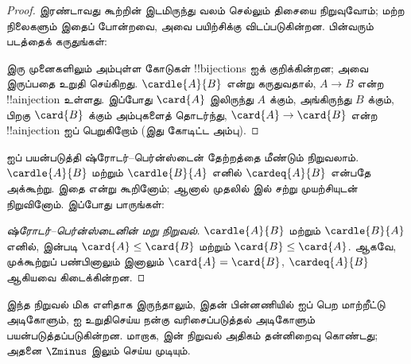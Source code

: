 \documentclass[../../../include/open-logic-section]{subfiles}
\begin{document}
\begin{proof}
இரண்டாவது கூற்றின் இடமிருந்து வலம் செல்லும் திசையை நிறுவுவோம்;
மற்ற நிலைகளும் இதைப் போன்றவை, அவை பயிற்சிக்கு விடப்படுகின்றன.
பின்வரும் படத்தைக் கருதுங்கள்:
\begin{center}
\end{center}
இரு முனைகளிலும் அம்புள்ள கோடுகள் !!{bijection}s ஐக் குறிக்கின்றன;
 அவை இருப்பதை உறுதி செய்கிறது.
$\cardle{A}{B}$ என்று கருதுவதால், $A\to B$ என்ற
!!a{injection} உள்ளது. இப்போது $\card{A}$ இலிருந்து $A$ க்கும்,
அங்கிருந்து $B$ க்கும், பிறகு $\card{B}$ க்கும் அம்புகளைத் தொடர்ந்து,
$\card{A} \to \card{B}$ என்ற !!a{injection} ஐப் பெறுகிறோம்
(இது கோடிட்ட அம்பு).
\end{proof}\noindent
{} ஐப் பயன்படுத்தி
ஷ்ரோடர்--பெர்ன்ஸ்டைன் தேற்றத்தை மீண்டும் நிறுவலாம்.
$\cardle{A}{B}$ மற்றும் $\cardle{B}{A}$ எனில் $\cardeq{A}{B}$
என்பதே அக்கூற்று. இதை 
என்று கூறினோம்; ஆனால் முதலில்  இல்
சற்று முயற்சியுடன் நிறுவினோம். இப்போது பாருங்கள்:

\begin{proof}[ஷ்ரோடர்--பெர்ன்ஸ்டைனின் மறு நிறுவல்]
$\cardle{A}{B}$ மற்றும் $\cardle{B}{A}$ எனில்,
 இன்படி $\card{A} \leq \card{B}$
மற்றும் $\card{B} \leq \card{A}$. ஆகவே, முக்கூற்றுப் பண்பினாலும்
 இனாலும் $\card{A} = \card{B}$,
$\cardeq{A}{B}$ ஆகியவை கிடைக்கின்றன.
\end{proof}
\noindent
இந்த நிறுவல் மிக எளிதாக இருந்தாலும், இதன் பின்னணியில்
 ஐப் பெற
மாற்றீட்டு அடிகோளும்,  ஐ உறுதிசெய்ய
நன்கு வரிசைப்படுத்தல் அடிகோளும் பயன்படுத்தப்படுகின்றன. மாறாக,
 இன் நிறுவல் அதிகம் தன்னிறைவு
கொண்டது; அதனை $\Zminus$ இலும் செய்ய முடியும்.
\end{document}
